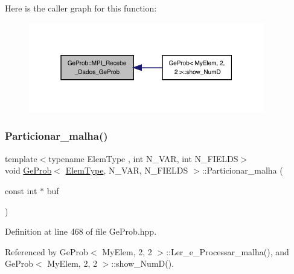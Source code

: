 Here is the caller graph for this function\+:
\nopagebreak
\begin{figure}[H]
\begin{center}
\leavevmode
\includegraphics[width=292pt]{classGeProb_a79ef11abf1d43923fb5a3613a3fa654e_icgraph}
\end{center}
\end{figure}
\mbox{\label{classGeProb_ac439ec4e4198924d385d8948edb20708}} 
\subsubsection{\texorpdfstring{Particionar\+\_\+malha()}{Particionar\_malha()}}
{\footnotesize\ttfamily template$<$typename Elem\+Type , int N\+\_\+\+V\+AR, int N\+\_\+\+F\+I\+E\+L\+DS$>$ \\
void \hyperlink{classGeProb}{Ge\+Prob}$<$ \hyperlink{spectral_8h_aaa2c1a7b2d1b12c590d730fe6ac839fa}{Elem\+Type}, N\+\_\+\+V\+AR, N\+\_\+\+F\+I\+E\+L\+DS $>$\+::Particionar\+\_\+malha (\begin{DoxyParamCaption}\item[{const int $\ast$}]{buf }\end{DoxyParamCaption})}



Definition at line 468 of file Ge\+Prob.\+hpp.



Referenced by Ge\+Prob$<$ My\+Elem, 2, 2 $>$\+::\+Ler\+\_\+e\+\_\+\+Processar\+\_\+malha(), and Ge\+Prob$<$ My\+Elem, 2, 2 $>$\+::show\+\_\+\+Num\+D().

